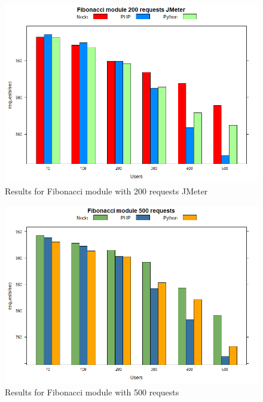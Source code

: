 \documentclass[../thesis.tex]{subfiles}
\begin{document}
\begin{figure}[H]
	\centering
	\includegraphics[width=1\textwidth]{../images/200requestsFiboJMeter.png}
	\caption{Results for Fibonacci module with 200 requests JMeter}
	\label{rys1}
\end{figure}
\begin{figure}[H]
\centering
\includegraphics[width=1\textwidth]{../images/500requestsFibo.png}
\caption{Results for Fibonacci module with 500 requests}
\label{rys1}
\end{figure}
\end{document}
